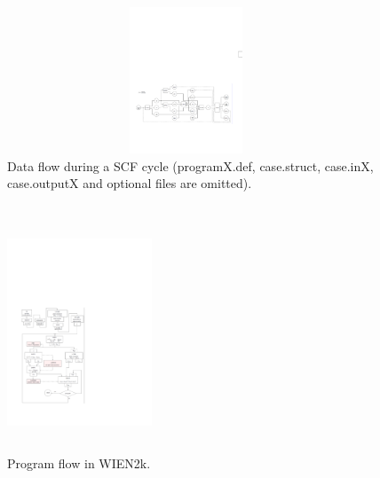 \frame
{
\frametitle{}
\begin{figure}[h!]
\centering
\hspace*{-10pt}
\includegraphics[height=1.72in,width=4.2in,viewport=30 165 550 375,clip]{Figures/WIEN2k_Data_flow.pdf}
\caption{\small \textrm{Data flow during a SCF cycle (programX.def, case.struct, case.inX, case.outputX and optional files are omitted).}}%
\label{WIEN2k_Data_flow}
\end{figure}
}
\frame
{
\frametitle{}
\begin{figure}[h!]
\centering
\vspace*{-20pt}
\includegraphics[height=2.80in,width=1.70in,viewport=60 90 325 500,clip]{Figures/WIEN2k_Program_flow.pdf}
\caption{\small \textrm{Program flow in WIEN2k.}}%
\label{WIEN2k_program_flow}
\end{figure}
}

